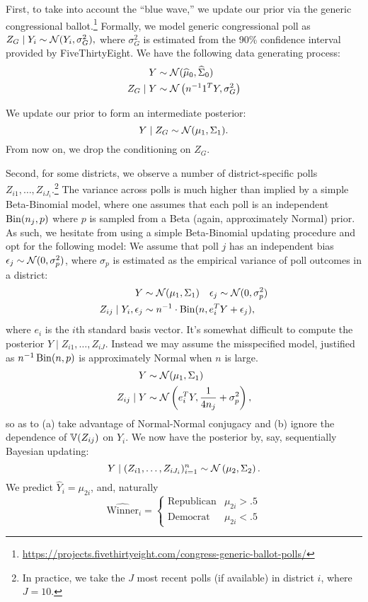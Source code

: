 \documentclass[10pt]{article}
\begin{document}
First, to take into account the ``blue wave,'' we update our prior via the generic congressional ballot.\footnote{\url{https://projects.fivethirtyeight.com/congress-generic-ballot-polls/}} Formally, we model generic congressional poll as $Z_{G} \mid Y_i \sim \mathcal{N}(Y_i, \sigma_G^2),$ where $\sigma_G^2$ is estimated from the 90\% confidence interval provided by FiveThirtyEight. We have the following data generating process: \begin{align*}
Y &\sim \mathcal{N}(\widehat \mu_0, \widehat \Sigma_0)\\
Z_G \mid Y &\sim \mathcal{N}\left({n^{-1}1^T Y, \sigma_G^2}\right)
\end{align*}

We update our prior to form an intermediate posterior: \[
Y \mid Z_G \sim \mathcal{N}(\mu_1, \Sigma_1).
\]
From now on, we drop the conditioning on $Z_G$.

Second, for some districts, we observe a number of district-specific polls $Z_{i1},\ldots,Z_{iJ_i}$.\footnote{In practice, we take the $J$ most recent polls (if available) in district $i$, where $J = 10$.} The variance across polls is much higher than implied by a simple Beta-Binomial model, where one assumes that each poll is an independent $\operatorname{Bin}(n_j,p)$ where $p$ is sampled from a Beta (again, approximately Normal) prior. As such, we hesitate from using a simple Beta-Binomial updating procedure and opt for the following model: We assume that poll $j$ has an independent bias $\epsilon_j \sim \mathcal{N}(0, \sigma^2_p)$, where $\sigma_p$ is estimated as the empirical variance of poll outcomes in a district: \begin{align*}
Y &\sim \mathcal{N}(\mu_1, \Sigma_1) \quad \epsilon_j \sim \mathcal{N}(0, \sigma_p^2) \\
Z_{ij}\mid Y_i, \epsilon_j &\sim n^{-1} \cdot \operatorname{Bin}(n, e_i^T Y + \epsilon_j),
\end{align*}
where $e_i$ is the $i$th standard basis vector. It's somewhat difficult to compute the posterior $Y \mid Z_{i1}, \ldots, Z_{iJ}$. Instead we may assume the misspecified model, justified as $n^{-1}\operatorname{Bin}(n, p)$ is approximately Normal when $n$ is large. \begin{align*}
Y &\sim \mathcal{N}(\mu_{1}, \Sigma_{1}) \\
Z_{ij} \mid Y &\sim \mathcal{N}\left({e_i^TY, \frac{1}{4n_j} + \sigma_p^2}\right),
\end{align*}
so as to (a) take advantage of Normal-Normal conjugacy and (b) ignore the dependence of $\mathbb{V}(Z_{ij})$ on $Y_i$. We now have the posterior by, say, sequentially Bayesian updating: \[
Y \mid (Z_{i1},\ldots,Z_{iJ_i})_{i=1}^n \sim \mathcal{N}\left({
    \mu_{2}, \Sigma_{2}
}\right).
\]
We predict $\hat Y_i = \mu_{2i}$, and, naturally \[
\hat{\text{Winner}}_i = \begin{cases}
    \text{Republican} & \mu_{2i} > .5 \\
    \text{Democrat} & \mu_{2i} < .5
\end{cases}
\]
\end{document}
